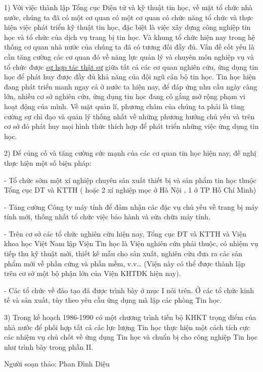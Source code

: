 \documentclass[11pt, a4paper, reqno, oneside]{book}
\begin{document}
1)	Với việc thành lập Tổng cục Điện tử và kỹ thuật tin học, về mặt tổ chức nhà nước, chúng ta đã có một cơ quan có một cơ quan có chức năng tổ chức và thực hiện việc phát triển kỹ thuật tin học, đặc biệt là việc xây dựng công nghiệp tin học và tổ chức của dịch vụ trang bị tin học. Và khung tổ chức hiện nay trong hệ thống cơ quan nhà nước của chúng ta đã có tương đối đầy đủ. Vấn đề cốt yếu là cần tăng cường các cơ quan đó về năng lực quản lý và chuyên môn nghiệp vụ và tổ chức được \underline{ sự hợp tác thật sự} giữa tất cả các cơ quan nghiên cứu, ứng dụng tin học để phát huy được đầy đủ khả năng của đội ngũ cán bộ tin học. Tin học hiện đang phát triển manh ngay cả ở nước ta hiện nay, để đáp ứng nhu cầu ngày càng lớn, nhiều cơ sở nghiên cứu, ứng dụng tin học đang cố gắng mở rộng phạm vi hoạt động của mình. Về mặt quản lí, phương châm của chúng ta phải là tăng cường sự chỉ đạo và quản lý thống nhất về những phương hướng chủ yếu và trên cơ sở đó phát huy mọi hình thức thích hợp để phát triển những việc ứng dụng tin học.


2)	Để củng cố và tăng cường sức mạnh của các cơ quan tin học hiện nay, đề nghị thực hiện một số biện pháp:


-	Tổ chức sớm một xí nghiệp chuyên sản xuất thiết bị và sản phẩm tin học thuộc Tổng cục DT và KTTH ( hoặc 2 xí nghiệp mọc ở Hà Nội , 1 ở TP Hồ Chí Minh)


-	Tăng cường Công ty máy tính để đảm nhận các đặc vụ chủ yếu về trang bị máy tính mới, thống nhất tổ chức việc bảo hành và sửa chữa máy tính.


-	Trên cơ sở các tổ chức nghiên cứu hiện nay, Tổng cục ĐT và KTTH và Viện khoa học Việt Nam lập Viện Tin học là Viện nghiên cứu phải thuộc, có nhiệm vụ tiếp thu kỹ thuật mới, thiết kế mẫu cho sản xuất, nghiên cứu đưa ra các sản phẩm mới về phần cứng và phần mềm, v.v… (Viện này có thể được thành lập trên cơ sở một bộ phận lớn của Viện KHTĐK hiện nay).


-	Các tổ chức về đào tạo đã được trình bày ở mục I nói trên. Ở các tổ chức kinh tế và sản xuất, tùy theo yêu cầu ứng dụng mà lập các phòng Tin học.


3) Trong kế hoạch 1986-1990 có một chương trình tiến bộ KHKT trọng điểm của nhà nước để phối hợp tất cả các lực lượng Tin học thực hiện một cách tích cực các nhiệm vụ chủ chốt về ứng dụng Tin học và chuẩn bị cho công nghiệp Tin học như trình bày trong phần II.
\begin{flushright}
Người soạn thảo: Phan Đình Diệu
\end{flushright}
\end{document}
